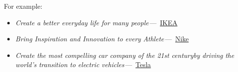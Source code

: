 %
%
For example:

\begin{itemize}
    \item \textit{Create a better everyday life for many people}\,---\,%
    \href{https://www.ikea.com/gb/en/this-is-ikea/about-us/vision-and-business-idea-pub9cd02291}{IKEA}
    \item \textit{Bring Inspiration and Innovation to every Athlete}\,---\,%
    \href{https://www.nike.com/gb/help/a/nikeinc-mission}{Nike}
    \item \textit{Create the most compelling car company of the 21st century\newline by driving the world's
    transition to electric vehicles}\,---\,%
    \href{https://visionarybusinessperson.com/tesla-mission-statement/}{Tesla}
\end{itemize}

